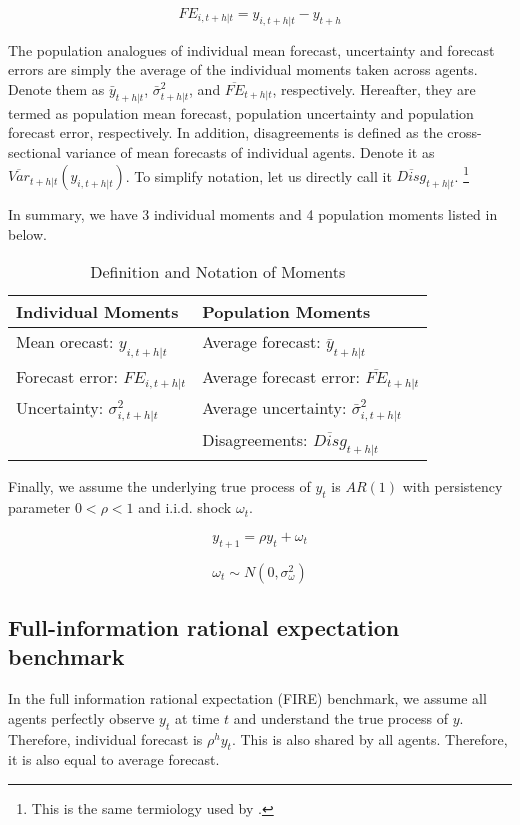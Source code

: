 \documentclass[]{article}
\begin{document}
$$FE_{i,t+h|t} = y_{i,t+h|t} - y_{t+h}$$

The population analogues of individual mean forecast, uncertainty and forecast errors are simply the average of the individual moments taken across agents. Denote them as $\bar y_{t+h|t}$, $\bar \sigma^2_{t+h|t}$, and $\overline{FE}_{t+h|t}$, respectively. Hereafter, they are termed as population mean forecast, population uncertainty and population forecast error, respectively. In addition, disagreements is defined as the cross-sectional variance of mean forecasts of individual agents.  Denote it as $\overline{Var}_{t+h|t}(y_{i,t+h|t}) $. To simplify notation, let us directly call it $\overline{Disg}_{t+h|t}$.  \footnote{This is the same termiology used by \cite{xx}.}

In summary, we have 3 individual moments and 4 population moments listed in below. 

\begin{table}[]
	\centering
		\caption{Definition and Notation of Moments}
	\begin{tabular}{ll}

		\hline 
		Individual Moments                                  & Population Moments                             \\
		\hline 
	Mean orecast: $y_{i,t+h|t}$                   & Average forecast: $\bar y_{t+h|t}$                   \\
		Forecast error: $FE_{i,t+h|t}$ & Average forecast error: $\overline{FE}_{t+h|t}$ \\
		Uncertainty: $\sigma^2_{i,t+h|t}$         & Average uncertainty:  $\bar \sigma^2_{i,t+h|t}$ \\
		& Disagreements:  $\overline{Disg}_{t+h|t}$       \\
		\hline 
	\end{tabular}
\end{table}

Finally, we assume the underlying true process of $y_{t}$ is $AR(1)$ with persistency parameter $0<\rho <1$ and i.i.d. shock $\omega_t$. 

$$y_{t+1} = \rho y_t + \omega_t$$

$$\omega_t \sim N(0,\sigma^2_{\omega})$$

\subsection{Full-information rational expectation benchmark }

In the full information rational expectation (FIRE) benchmark,  we assume all agents perfectly observe $y_t$ at time $t$ and understand the true process of $y$. Therefore, individual forecast is $\rho^h y_t $. This is also shared by all agents. Therefore, it is also equal to average forecast. 
\end{document}
